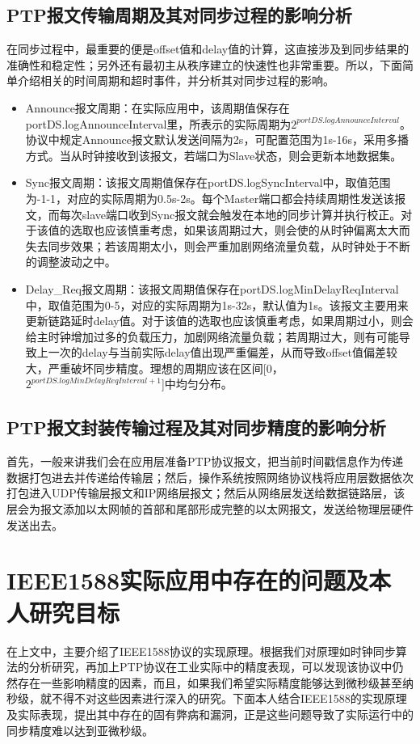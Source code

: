 \subsection{PTP报文传输周期及其对同步过程的影响分析}
在同步过程中，最重要的便是offset值和delay值的计算，这直接涉及到同步结果的准确性和稳定性；另外还有最初主从秩序建立的快速性也非常重要。所以，下面简单介绍相关的时间周期和超时事件，并分析其对同步过程的影响。
\begin{itemize}[noitemsep,topsep=0pt,parsep=0pt,partopsep=0pt]
	\item Announce报文周期：在实际应用中，该周期值保存在portDS.logAnnounceInterval里，所表示的实际周期为$2^{portDS.logAnnounceInterval}$。协议中规定Announce报文默认发送间隔为2s，可配置范围为1s-16s，采用多播方式。当从时钟接收到该报文，若端口为Slave状态，则会更新本地数据集。
	\item Sync报文周期：该报文周期值保存在portDS.logSyncInterval中，取值范围为-1-1，对应的实际周期为0.5s-2s。每个Master端口都会持续周期性发送该报文，而每次slave端口收到Sync报文就会触发在本地的同步计算并执行校正。对于该值的选取也应该慎重考虑，如果该周期过大，则会使的从时钟偏离太大而失去同步效果；若该周期太小，则会严重加剧网络流量负载，从时钟处于不断的调整波动之中。
	\item Delay\_Req报文周期：该报文周期值保存在portDS.logMinDelayReqInterval中，取值范围为0-5，对应的实际周期为1s-32s，默认值为1s。该报文主要用来更新链路延时delay值。对于该值的选取也应该慎重考虑，如果周期过小，则会给主时钟增加过多的负载压力，加剧网络流量负载；若周期过大，则有可能导致上一次的delay与当前实际delay值出现严重偏差，从而导致offset值偏差较大，严重破坏同步精度。理想的周期应该在区间[0， $2^{portDS.logMinDelayReqInterval+1}$]中均匀分布。
\end{itemize}

\subsection{PTP报文封装传输过程及其对同步精度的影响分析}
首先，一般来讲我们会在应用层准备PTP协议报文，把当前时间戳信息作为传递数据打包进去并传递给传输层；然后，操作系统按照网络协议栈将应用层数据依次打包进入UDP传输层报文和IP网络层报文；然后从网络层发送给数据链路层，该层会为报文添加以太网帧的首部和尾部形成完整的以太网报文，发送给物理层硬件发送出去。

\section{IEEE1588实际应用中存在的问题及本人研究目标}
在上文中，主要介绍了IEEE1588协议的实现原理。根据我们对原理如时钟同步算法的分析研究，再加上PTP协议在工业实际中的精度表现，可以发现该协议中仍然存在一些影响精度的因素，而且，如果我们希望实际精度能够达到微秒级甚至纳秒级，就不得不对这些因素进行深入的研究。下面本人结合IEEE1588的实现原理及实际表现，提出其中存在的固有弊病和漏洞，正是这些问题导致了实际运行中的同步精度难以达到亚微秒级。

